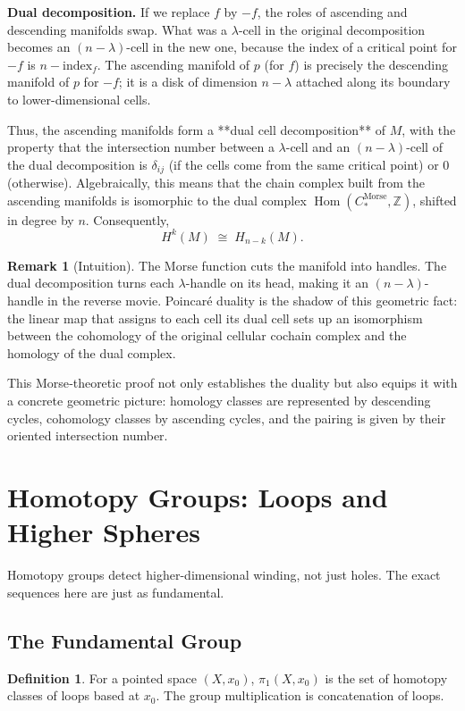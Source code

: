 \documentclass{article}
\theoremstyle{definition}
\newtheorem{definition}{Definition}[section]
\newtheorem{remark}{Remark}[section]
\begin{document}
\textbf{Dual decomposition.}  
If we replace \(f\) by \(-f\), the roles of ascending and descending manifolds swap.  
What was a \(\lambda\)-cell in the original decomposition becomes an \((n-\lambda)\)-cell in the new one, because the index of a critical point for \(-f\) is \(n - \text{index}_f\).  
The ascending manifold of \(p\) (for \(f\)) is precisely the descending manifold of \(p\) for \(-f\); it is a disk of dimension \(n-\lambda\) attached along its boundary to lower-dimensional cells.

Thus, the ascending manifolds form a **dual cell decomposition** of \(M\), with the property that the intersection number between a \(\lambda\)-cell and an \((n-\lambda)\)-cell of the dual decomposition is \(\delta_{ij}\) (if the cells come from the same critical point) or \(0\) (otherwise).  
Algebraically, this means that the chain complex built from the ascending manifolds is isomorphic to the dual complex \(\operatorname{Hom}(C^{\text{Morse}}_*, \mathbb{Z})\), shifted in degree by \(n\).  
Consequently,
\[
H^k(M) \;\cong\; H_{n-k}(M).
\]

\begin{remark}[Intuition]
The Morse function cuts the manifold into handles.  
The dual decomposition turns each \(\lambda\)-handle on its head, making it an \((n-\lambda)\)-handle in the reverse movie.  
Poincaré duality is the shadow of this geometric fact: the linear map that assigns to each cell its dual cell sets up an isomorphism between the cohomology of the original cellular cochain complex and the homology of the dual complex.
\end{remark}

This Morse‑theoretic proof not only establishes the duality but also equips it with a concrete geometric picture: homology classes are represented by descending cycles, cohomology classes by ascending cycles, and the pairing is given by their oriented intersection number.
\section{Homotopy Groups: Loops and Higher Spheres}
Homotopy groups detect higher-dimensional winding, not just holes. The exact sequences here are just as fundamental.

\subsection{The Fundamental Group}
\begin{definition}
For a pointed space $(X,x_0)$, $\pi_1(X,x_0)$ is the set of homotopy classes of loops based at $x_0$. The group multiplication is concatenation of loops.
\end{definition}
\end{document}
